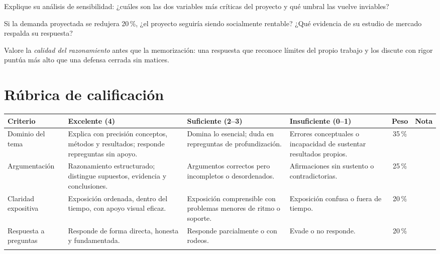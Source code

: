 \documentclass{academic-exam}
\begin{document}
\begin{pregunta}
Explique su análisis de sensibilidad: ¿cuáles son las dos variables más
críticas del proyecto y qué umbral las vuelve inviables?
\end{pregunta}

\begin{pregunta}
Si la demanda proyectada se redujera 20\,\%, ¿el proyecto seguiría siendo
socialmente rentable? ¿Qué evidencia de su estudio de mercado respalda su
respuesta?
\end{pregunta}

\begin{observacion}
Valore la \emph{calidad del razonamiento} antes que la memorización:
una respuesta que reconoce límites del propio trabajo y los discute con
rigor puntúa más alto que una defensa cerrada sin matices.
\end{observacion}

\section*{\color{colorprimario}Rúbrica de calificación}

{\small
\renewcommand{\arraystretch}{1.45}
\begin{tabularx}{\textwidth}{@{}p{2.6cm} X X X c c@{}}
  \textbf{Criterio} & \textbf{Excelente (4)} & \textbf{Suficiente (2--3)}
    & \textbf{Insuficiente (0--1)} & \textbf{Peso} & \textbf{Nota}\\
  \hline\addlinespace[4pt]
  Dominio del tema &
    Explica con precisión conceptos, métodos y resultados; responde
    repreguntas sin apoyo. &
    Domina lo esencial; duda en repreguntas de profundización. &
    Errores conceptuales o incapacidad de sustentar resultados propios.
    & 35\,\% & \\
  \addlinespace[4pt]
  Argumentación &
    Razonamiento estructurado; distingue supuestos, evidencia y
    conclusiones. &
    Argumentos correctos pero incompletos o desordenados. &
    Afirmaciones sin sustento o contradictorias. & 25\,\% & \\
  \addlinespace[4pt]
  Claridad expositiva &
    Exposición ordenada, dentro del tiempo, con apoyo visual eficaz. &
    Exposición comprensible con problemas menores de ritmo o soporte. &
    Exposición confusa o fuera de tiempo. & 20\,\% & \\
  \addlinespace[4pt]
  Respuesta a preguntas &
    Responde de forma directa, honesta y fundamentada. &
    Responde parcialmente o con rodeos. &
    Evade o no responde. & 20\,\% & \\
  \addlinespace[6pt]\hline\addlinespace[6pt]
  \multicolumn{4}{r}{\textbf{Nota final (sobre 20):}} &
  \multicolumn{2}{l}{\hrulefill}\\
\end{tabularx}
}
\end{document}
